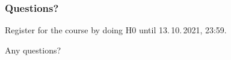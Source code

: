 \begin{assignment}
	\frametitle{Questions?}
	\begin{task}
	Register for the course by doing H0 until 13.\,10.\,2021, 23:59.
	\end{task}

	\begin{task}
	Any questions?
	\end{task}
\end{assignment}



\nocite{raab2017introducing}

\appendix

\begin{frame}[allowframebreaks]
	
	
\end{frame}




